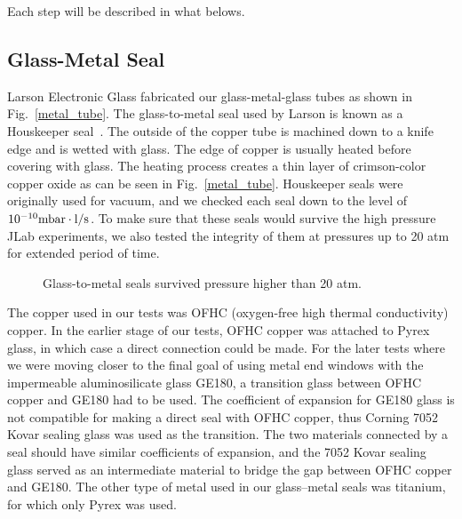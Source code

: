 Each step will be described in what belows.

\subsection{Glass-Metal Seal}

Larson Electronic Glass fabricated our glass-metal-glass tubes as shown in Fig.~\ref{metal_tube}. The glass-to-metal seal used by Larson is known as a Houskeeper seal~\cite{Houskeeper}. The outside of the copper tube is machined down to a knife edge and is wetted with glass. The edge of copper is usually heated before covering with glass. The heating process creates a thin layer of crimson-color copper oxide as can be seen in Fig.~\ref{metal_tube}. Houskeeper seals were originally used for vacuum, and we checked each seal down to the level of $10^{-10}{\rm mbar\cdot l/s}$. To make sure that these seals would survive the high pressure JLab experiments, we also tested the integrity of them at pressures up to 20 atm for extended period of time.

\begin{figure}[t!]
	\centering
	\caption{{Glass-to-metal seals survived pressure higher than 20 atm.}}
	\label{pressure_test}
\end{figure}

The copper used in our tests was OFHC (oxygen-free high thermal conductivity) copper. In the earlier stage of our tests, OFHC copper was attached to Pyrex glass, in which case a direct connection could be made. For the later tests where we were moving closer to the final goal of using metal end windows with the impermeable aluminosilicate glass GE180, a transition glass between OFHC copper and GE180 had to be used. The coefficient of expansion for GE180 glass is not compatible for making a direct seal with OFHC copper, thus Corning 7052 Kovar sealing glass was used as the transition. The two materials connected by a seal should have similar coefficients of expansion, and the 7052 Kovar sealing glass served as an intermediate material to bridge the gap between OFHC copper and GE180. The other type of metal used in our glass--metal seals was titanium, for which only Pyrex was used.

